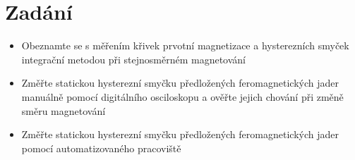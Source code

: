 \section{Zadání}
\begin{itemize}
	\item Obeznamte se s měřením křivek prvotní magnetizace a hysterezních smyček integrační metodou při stejnosměrném magnetování
	\item Změřte statickou hysterezní smyčku předložených feromagnetických jader manuálně pomocí digitálního osciloskopu a ověřte jejich chování při změně směru magnetování
	\item Změřte statickou hysterezní smyčku předložených feromagnetických jader pomocí automatizovaného pracoviště
\end{itemize}
